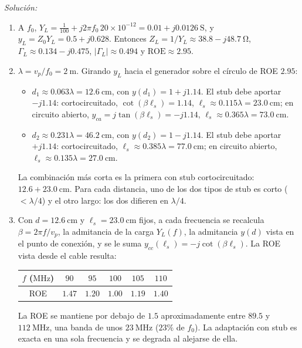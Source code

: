 \documentclass[a4paper,11pt]{article}
\newenvironment{solucion}[1][]{
\noindent \large \textsl{Solución:} \ifthenelse{\equal{#1}{}}{}{\emph{(#1)}}

\smallskip
}{
\bigskip
}
\begin{document}
\begin{solucion}
\begin{enumerate}
\item A $f_0$, $Y_L=\frac{1}{100}+j2\pi f_0\,20\times10^{-12}=0.01+j0.0126\ \unit{\siemens}$, y $y_L=Z_0Y_L=0.5+j0.628$. Entonces $Z_L=1/Y_L\approx38.8-j48.7\ \unit{\ohm}$, $\Gamma_L\approx0.134-j0.475$, $|\Gamma_L|\approx0.494$ y $\mathrm{ROE}\approx2.95$.
\item $\lambda=v_p/f_0=2\ \unit{\meter}$. Girando $y_L$ hacia el generador sobre el círculo de ROE $2.95$:
\begin{itemize}
\item $d_1\approx0.063\lambda=12.6\ \unit{\centi\meter}$, con $y(d_1)=1+j1.14$. El stub debe aportar $-j1.14$: cortocircuitado, $\cot(\beta\ell_s)=1.14$, $\ell_s\approx0.115\lambda=23.0\ \unit{\centi\meter}$; en circuito abierto, $y_{ca}=j\tan(\beta\ell_s)=-j1.14$, $\ell_s\approx0.365\lambda=73.0\ \unit{\centi\meter}$.
\item $d_2\approx0.231\lambda=46.2\ \unit{\centi\meter}$, con $y(d_2)=1-j1.14$. El stub debe aportar $+j1.14$: cortocircuitado, $\ell_s\approx0.385\lambda=77.0\ \unit{\centi\meter}$; en circuito abierto, $\ell_s\approx0.135\lambda=27.0\ \unit{\centi\meter}$.
\end{itemize}
La combinación más corta es la primera con stub cortocircuitado: $12.6+23.0\ \unit{\centi\meter}$. Para cada distancia, uno de los dos tipos de stub es corto ($<\lambda/4$) y el otro largo: los dos difieren en $\lambda/4$.
\item Con $d=12.6\ \unit{\centi\meter}$ y $\ell_s=23.0\ \unit{\centi\meter}$ fijos, a cada frecuencia se recalcula $\beta=2\pi f/v_p$, la admitancia de la carga $Y_L(f)$, la admitancia $y(d)$ vista en el punto de conexión, y se le suma $y_{cc}(\ell_s)=-j\cot(\beta\ell_s)$. La ROE vista desde el cable resulta:
\begin{center}
\begin{tabular}{c|ccccc}
$f$ ($\unit{\mega\hertz}$) & $90$ & $95$ & $100$ & $105$ & $110$\\ \hline
ROE & $1.47$ & $1.20$ & $1.00$ & $1.19$ & $1.40$
\end{tabular}
\end{center}
La ROE se mantiene por debajo de $1.5$ aproximadamente entre $89.5$ y $112\ \unit{\mega\hertz}$, una banda de unos $23\ \unit{\mega\hertz}$ ($23\%$ de $f_0$). La adaptación con stub es exacta en una sola frecuencia y se degrada al alejarse de ella.
\end{enumerate}
\end{solucion}
\end{document}
